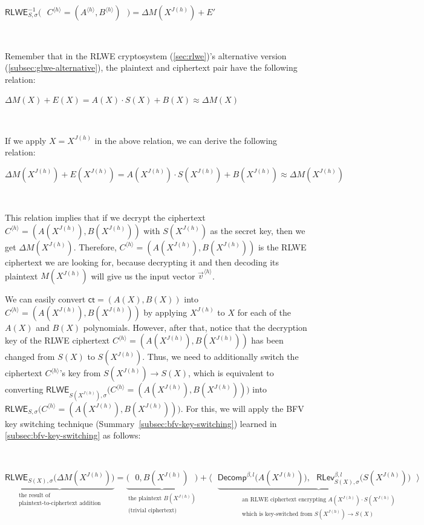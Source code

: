 $\textsf{RLWE}^{-1}_{S, \sigma}\bm{(} \text{ } C^{\langle h \rangle} = (A^{\langle h \rangle}, B^{\langle h \rangle}) \text{ }\bm{)} = \Delta M(X^{J(h)}) + E'$

$ $

Remember that in the RLWE cryptosystem (\autoref{sec:rlwe})'s alternative version (\autoref{subsec:glwe-alternative}), the plaintext and ciphertext pair have the following relation:

$\Delta M(X) + E(X) = A(X)\cdot S(X) + B(X) \approx \Delta M(X)$

$ $

If we apply $X = X^{J(h)}$ in the above relation, we can derive the following relation: 

$\Delta M(X^{J(h)}) + E(X^{J(h)}) = A(X^{J(h)}) \cdot S(X^{J(h)}) + B(X^{J(h)}) \approx \Delta M(X^{J(h)})$

$ $

This relation implies that if we decrypt the ciphertext $C^{\langle h \rangle} = (A(X^{J(h)}), B(X^{J(h)}))$ with $S(X^{J(h)})$ as the secret key, then we get $\Delta M(X^{J(h)})$. Therefore, $C^{\langle h \rangle} = (A(X^{J(h)}), B(X^{J(h)}))$ is the RLWE ciphertext we are looking for, because decrypting it and then decoding its plaintext $M(X^{J(h)})$ will give us the input vector $\vec{v}^{\langle h \rangle}$. 

We can easily convert $\textsf{ct} = (A(X), B(X))$ into $C^{\langle h \rangle} = (A(X^{J(h)}), B(X^{J(h)}))$ by applying $X^{J(h)}$ to $X$ for each of the $A(X)$ and $B(X)$ polynomials. However, after that, notice that the decryption key of the RLWE ciphertext $C^{\langle h \rangle} = (A(X^{J(h)}), B(X^{J(h)}))$ has been changed from $S(X)$ to $S(X^{J(h)})$. Thus, we need to additionally switch the ciphertext $C^{\langle h \rangle}$'s key from $S(X^{J(h)}) \rightarrow S(X)$, which is equivalent to converting $\textsf{RLWE}_{S(X^{J(h)}), \sigma}\bm{(} C^{\langle h \rangle} = (A(X^{J(h)}), B(X^{J(h)})) \bm{)}$ into $\textsf{RLWE}_{S, \sigma}\bm{(} C^{\langle h \rangle} = (A(X^{J(h)}), B(X^{J(h)})) \bm{)}$. For this, we will apply the BFV key switching technique (Summary~\ref*{subsec:bfv-key-switching}) learned in \autoref{subsec:bfv-key-switching} as follows: 

$ $

\noindent $\underbrace{\textsf{RLWE}_{S(X),\sigma}\bm{(}\Delta M(X^{J(h)})\bm{)}}_{\substack{\text{the result of} \\ \text{plaintext-to-ciphertext addition}}} = \underbrace{\bm{(} \text{ } 0, B(X^{J(h)}) \text{ } \bm{)}}_{\substack{\text{the plaintext } B(X^{J(h)}) \\ \text{(trivial ciphertext)}}} + \bm{\langle} \text{ } \underbrace{\textsf{Decomp}^{\beta, l}\bm{(}A(X^{J(h)})\bm{)}, \text{ } \textsf{RLev}_{S(X), \sigma}^{\beta, l}\bm{(}S(X^{J(h)})\bm{)} \text{ } \bm{\rangle}}_{\substack{\substack{\text{an RLWE ciphertext encrypting $A(X^{J(h)}) \cdot S(X^{J(h)})$}\\ \text{which is key-switched from $S(X^{J(h)})\rightarrow S(X)$}}}}$



